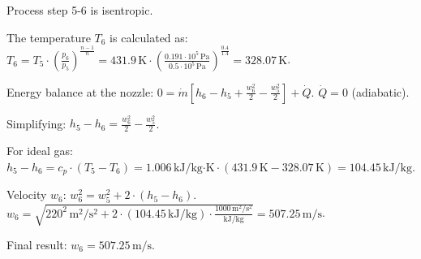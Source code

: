 Process step 5-6 is isentropic.  

The temperature \( T_6 \) is calculated as:  
\( T_6 = T_5 \cdot \left( \frac{p_6}{p_5} \right)^{\frac{n-1}{n}} = 431.9 \, \text{K} \cdot \left( \frac{0.191 \cdot 10^5 \, \text{Pa}}{0.5 \cdot 10^5 \, \text{Pa}} \right)^{\frac{0.4}{1.4}} = 328.07 \, \text{K} \).  

Energy balance at the nozzle:  
\( 0 = \dot{m} \left[ h_6 - h_5 + \frac{w_6^2}{2} - \frac{w_5^2}{2} \right] + \dot{Q} \).  
\( \dot{Q} = 0 \) (adiabatic).  

Simplifying:  
\( h_5 - h_6 = \frac{w_6^2}{2} - \frac{w_5^2}{2} \).  

For ideal gas:  
\( h_5 - h_6 = c_p \cdot (T_5 - T_6) = 1.006 \, \text{kJ/kg·K} \cdot (431.9 \, \text{K} - 328.07 \, \text{K}) = 104.45 \, \text{kJ/kg} \).  

Velocity \( w_6 \):  
\( w_6^2 = w_5^2 + 2 \cdot (h_5 - h_6) \).  
\( w_6 = \sqrt{220^2 \, \text{m}^2/\text{s}^2 + 2 \cdot (104.45 \, \text{kJ/kg}) \cdot \frac{1000 \, \text{m}^2/\text{s}^2}{\text{kJ/kg}}} = 507.25 \, \text{m/s} \).  

Final result:  
\( w_6 = 507.25 \, \text{m/s} \).